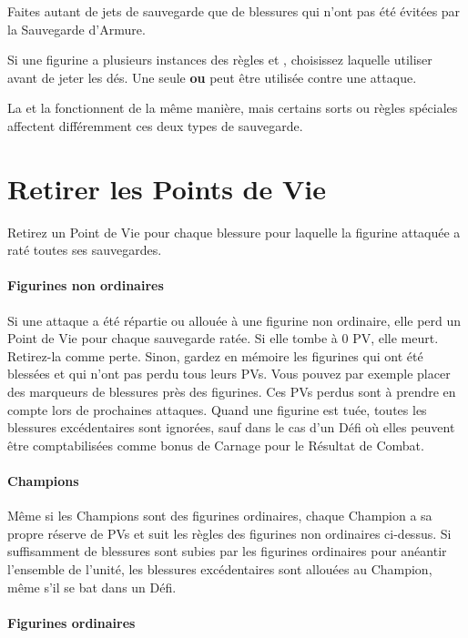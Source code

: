 Faites autant de jets de sauvegarde que de blessures qui n'ont pas été évitées par la Sauvegarde d'Armure.

Si une figurine a plusieurs instances des règles \regeneration{} et \wardsave{}, choisissez laquelle utiliser avant de jeter les dés. Une seule \regeneration{} \textbf{ou} \wardsave{} peut être utilisée contre une attaque.

La \regeneration{} et la \wardsave{} fonctionnent de la même manière, mais certains sorts ou règles spéciales affectent différemment ces deux types de sauvegarde.

\newpage
\section{Retirer les Points de Vie}

Retirez un Point de Vie pour chaque blessure pour laquelle la figurine attaquée a raté toutes ses sauvegardes.

\paragraph{Figurines non ordinaires}

Si une attaque a été répartie ou allouée à une figurine non ordinaire, elle perd un Point de Vie pour chaque sauvegarde ratée. Si elle tombe à 0 PV, elle meurt. Retirez-la comme perte. Sinon, gardez en mémoire les figurines qui ont été blessées et qui n'ont pas perdu tous leurs PVs. Vous pouvez par exemple placer des marqueurs de blessures près des figurines. Ces PVs perdus sont à prendre en compte lors de prochaines attaques. Quand une figurine est tuée, toutes les blessures excédentaires sont ignorées, sauf dans le cas d'un Défi où elles peuvent être comptabilisées comme bonus de Carnage pour le Résultat de Combat. 

\paragraph{Champions}

Même si les Champions sont des figurines ordinaires, chaque Champion a sa propre réserve de PVs et suit les règles des figurines non ordinaires ci-dessus. Si suffisamment de blessures sont subies par les figurines ordinaires pour anéantir l'ensemble de l'unité, les blessures excédentaires sont allouées au Champion, même s'il se bat dans un Défi.

\paragraph{Figurines ordinaires}


